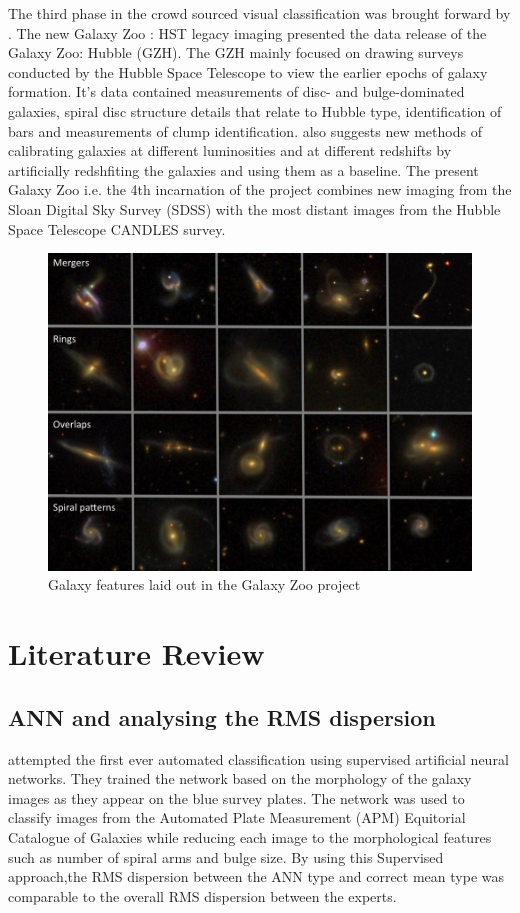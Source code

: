 \documentclass[a4paper,12pt]{report}
\begin{document}
\hspace*{0.5 in}The third phase in the crowd sourced visual classification was brought forward by \cite{Willet2016HST}. The new Galaxy Zoo : HST legacy imaging presented the data release of the Galaxy Zoo: Hubble (GZH). The GZH mainly focused on drawing surveys conducted by the Hubble Space Telescope to view the earlier epochs of galaxy formation. It's data contained measurements of disc- and bulge-dominated galaxies, spiral disc structure details that relate to Hubble type, identification of bars and measurements of clump identification. \cite{Willet2016HST} also suggests new methods of calibrating galaxies at different luminosities and at different redshifts by artificially redshfiting the galaxies and using them as a baseline. The present Galaxy Zoo i.e. the 4th incarnation of the project combines new imaging from the Sloan Digital Sky Survey (SDSS) with the most distant images from the Hubble Space Telescope CANDLES survey.
\begin{figure}[t]
    \centering
    \includegraphics[width=.7\textwidth, height=.4\textheight]{figures/galaxyclass.jpg}
    \caption{Galaxy features laid out in the Galaxy Zoo project}
\end{figure}

\chapter{Literature Review}
\section{ANN and analysing the RMS dispersion}
\hspace*{0.5 in}\cite{Naim/mnras/275.3.567} attempted the first ever automated classification using supervised artificial neural networks. They trained the network based on the morphology of the galaxy images as they appear on the blue survey plates. The network was used to classify images from the Automated Plate Measurement (APM) Equitorial Catalogue of Galaxies while reducing each image to the morphological features such as number of spiral arms and bulge size. By using this Supervised approach,the RMS dispersion between the ANN type and correct mean type was comparable to the overall RMS dispersion between the experts. 
\end{document}
